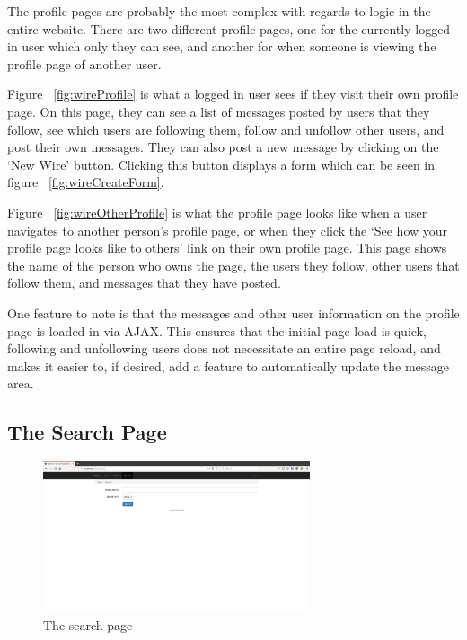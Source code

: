The profile pages are probably the most complex with regards to logic in the
entire website. There are two different profile pages, one for the currently
logged in user which only they can see, and another for when someone is
viewing the profile page of another user.

Figure ~\ref{fig:wireProfile} is what a logged in user sees if they visit
their own profile page. On this page, they can see a list of messages posted
by users that they follow, see which users are following them, follow and
unfollow other users, and post their own messages. They can also post a
new message by clicking on the `New Wire' button. Clicking this button
displays a form which can be seen in figure ~\ref{fig:wireCreateForm}.

Figure ~\ref{fig:wireOtherProfile} is what the profile page looks like
when a user navigates to another person's profile page, or when they click
the `See how your profile page looks like to others' link on their own
profile page. This page shows the name of the person who owns the page,
the users they follow, other users that follow them, and messages that
they have posted.

One feature to note is that the messages and other user information on
the profile page is loaded in via AJAX. This ensures that the initial
page load is quick, following and unfollowing users does not necessitate
an entire page reload, and makes it easier to, if desired, add a feature
to automatically update the message area.

\subsection{The Search Page}

\begin{figure}[H]
    \centering
    \includegraphics[width=0.7\textwidth]{final_report/pics/searchBase.png}
    \caption{The search page}
    \label{fig:wireSearch}
\end{figure}

